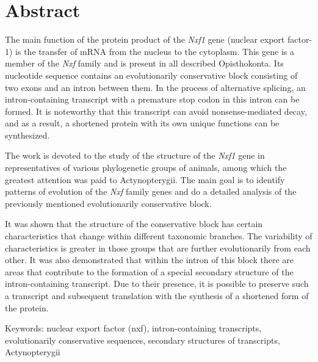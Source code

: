 \clearpage
\section{Abstract}

The main function of the protein product of the \textit{Nxf1} gene (nuclear export factor-1) is the transfer of mRNA from the nucleus to the cytoplasm. This gene is a member of the \textit{Nxf} family and is present in all described Opisthokonta. Its nucleotide sequence contains an evolutionarily conservative block consisting of two exons and an intron between them. In the process of alternative splicing, an intron-containing transcript with a premature stop codon in this intron can be formed. It is noteworthy that this transcript can avoid nonsense-mediated decay, and as a result, a shortened protein with its own unique functions can be synthesized.

The work is devoted to the study of the structure of the \textit{Nxf1} gene in representatives of various phylogenetic groups of animals, among which the greatest attention was paid to Actynopterygii. The main goal is to identify patterns of evolution of the \textit{Nxf} family genes and do a detailed analysis of the previously mentioned evolutionarily conservative block.

It was shown that the structure of the conservative block has certain characteristics that change within different taxonomic branches. The variability of characteristics is greater in those groups that are further evolutionarily from each other. It was also demonstrated that within the intron of this block there are areas that contribute to the formation of a special secondary structure of the intron-containing transcript. Due to their presence, it is possible to preserve such a transcript and subsequent translation with the synthesis of a shortened form of the protein.

\vspace{1em}

Keywords: nuclear export factor (nxf), intron-containing transcripts, evolutionarily conservative sequences, secondary structures of transcripts, Actynopterygii